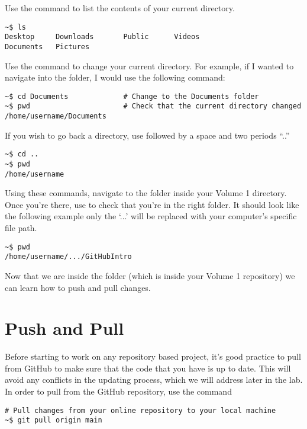 Use the command  to list the contents of your current directory.

\begin{lstlisting}
~$ ls
Desktop		Downloads		Public 		Videos
Documents 	Pictures
\end{lstlisting}

Use the command  to change your current directory. For example, if I wanted to navigate into the  folder, I would use the following command:

\begin{lstlisting}
~$ cd Documents				# Change to the Documents folder
~$ pwd						# Check that the current directory changed
/home/username/Documents
\end{lstlisting}

If you wish to go back a directory, use  followed by a space and two periods ``{..}''

\begin{lstlisting}
~$ cd ..
~$ pwd
/home/username
\end{lstlisting}

Using these commands, navigate to the  folder inside your Volume 1 directory.
Once you're there, use  to check that you're in the right folder.
It should look like the following example only the `...' will be replaced with your computer's 
specific file path.

\begin{lstlisting}
~$ pwd
/home/username/.../GitHubIntro
\end{lstlisting}

Now that we are inside the  folder (which is inside your Volume 1 repository) we can learn how to push and 
pull changes.
    
\section{Push and Pull}
    
Before starting to work on any repository based project, it's good practice to pull from GitHub to make sure that the code that you have 
is up to date. This will avoid any conflicts in the updating process, which we will address later in the lab. 
In order to pull from the GitHub repository, use the command 

\begin{lstlisting}
# Pull changes from your online repository to your local machine
~$ git pull origin main
\end{lstlisting}

